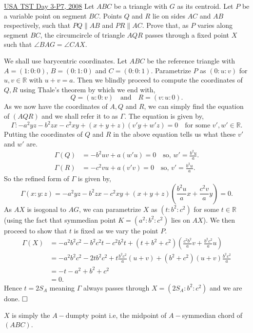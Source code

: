 \begin{problem}{10}{\href{https://artofproblemsolving.com/community/q2h224628p35453908}{USA TST Day 3-P7, 2008}} 
	Let $ ABC$ be a triangle with $ G$ as its centroid. Let $ P$ be a variable point on segment $ BC$. Points $ Q$ and $ R$ lie on sides $ AC$ and $ AB$ respectively, such that $ PQ \parallel AB$ and $ PR \parallel AC$. Prove that, as $ P$ varies along segment $ BC$, the circumcircle of triangle $ AQR$ passes through a fixed point $ X$ such that $ \angle BAG = \angle CAX$.
	\begin{solution} We shall use barycentric coordinates. Let $ABC$ be the reference triangle with $A=(1:0:0)$, $B=(0:1:0)$ and $C=(0:0:1)$. Parametrize $P$ as $(0:u:v)$ for $u,v\in\mathbb{R}$ with $u+v=a$. Then we blindly proceed to compute the coordinates of $Q, R$ using Thale's theorem by which we end with,
$$Q=(u:0:v)\quad\text{and}\quad R=(v:u:0).$$As we now have the coordinates of $A,Q$ and $R$, we can simply find the equation of $(AQR)$ and we shall refer it to as $\Gamma$. The equation is given by,
$$\Gamma: -a^2yz -b^2zx-c^2xy+(x+y+z)(v'y+w'z)=0\quad\text{for some $v', w'\in\mathbb{R}$.}$$Putting the coordinates of $Q$ and $R$ in the above equation tells us what these $v'$ and $w'$ are.
\begin{align*} \Gamma(Q)&=-b^2uv+a(w'u)=0 \quad\text{so, $w'=\frac{b^2u}{a}$.}\\ \Gamma(R)&=-c^2vu+a(v'v)=0 \quad\text{so, $v'=\frac{b^2u}{a}$.} \end{align*}So the refined form of $\Gamma$ is given by,
$$\Gamma (x:y:z)=-a^2yz-b^2zx-c^2xy+(x+y+z)\left(\frac{b^2u}{a}x+\frac{c^2v}{a}y\right)=0.$$As $AX$ is isogonal to $AG$, we can parametrize $X$ as $(t:b^2:c^2)$ for some $t\in\mathbb{R}$ (using the fact that symmedian point $K=(a^2:b^2:c^2)$ lies on $AX$). We then proceed to show that $t$ is fixed as we vary the point $P$.
\begin{align*} \Gamma(X)&= -a^2b^2c^2-b^2c^2t-c^2b^2t+(t+b^2+c^2)\left(\frac{c^2b^2}{a}v+\frac{b^2c^2}{a}u\right)\\ &=-a^2b^2c^2-2tb^2c^2+t\frac{b^2c^2}{a}(u+v)+(b^2+c^2)(u+v)\frac{b^2c^2}{a}\\ &=-t-a^2+b^2+c^2\\ &=0. \end{align*}Hence $t=2S_A$ meaning $\Gamma$ always passes through $X=(2S_A:b^2:c^2)$ and we are done. $\qedwhite$

	\begin{remark} 
		$X$ is simply the $A-$dumpty point i.e, the midpoint of $A-$symmedian chord of $(ABC)$.
	\end{remark}
	\end{solution}
\end{problem}
	
